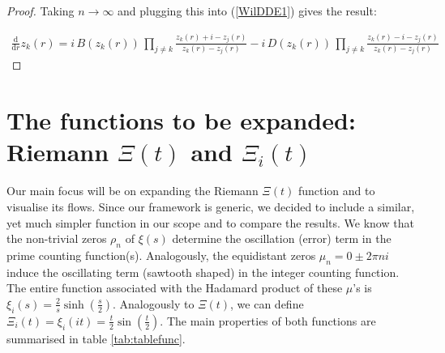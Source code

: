 \documentclass[a4paper,11pt,twoside]{amsart}
\begin{document}
\begin{proof}
Taking $n \rightarrow \infty$ and plugging this into (\ref{WilDDE1}) gives the result:

\begin{align} \label{WilDDE2}
 \frac{\mathrm{d}}{\mathrm{d} r}z_k(r) = i\,B(z_k(r))\, \prod_{j \ne k} \frac{z_k(r)+i-z_j(r)}{z_k(r)-z_j(r)} -i\,D(z_k(r))\,\prod_{j \ne k} \frac{z_k(r)-i-z_j(r)}{z_k(r)-z_j(r)}
\end{align}
\end{proof}

\section{The functions to be expanded: Riemann $\Xi(t)$ and $\Xi_i(t)$} \label{functobexpanded}
Our main focus will be on expanding the Riemann $\Xi(t)$ function and to visualise its flows. Since our framework is generic, we decided to include a similar, yet much simpler function in our scope and to compare the results. We know that the non-trivial zeros $\rho_n$ of $\xi(s)$ determine the oscillation (error) term in the prime counting function(s). Analogously, the equidistant zeros $\mu_n=0 \pm 2\pi n i$ induce the oscillating term (sawtooth shaped) in the integer counting function. The entire function associated with the Hadamard product of these $\mu$'s is $\xi_i(s)=\frac{2}{s}\sinh\left(\frac{s}{2}\right)$. Analogously to $\Xi(t)$, we can define $\Xi_i(t) =  \xi_i\left(it\right) = \frac{t}{2}\sin\left(\frac{t}{2}\right)$. The main properties of both functions are summarised in table \ref{tab:tablefunc}.
\end{document}
